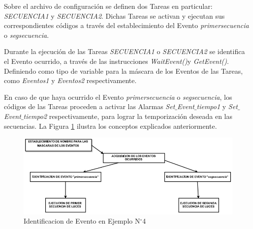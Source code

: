 \documentclass[12pt,letterpaper]{article}
\begin{document}
Sobre el archivo de configuración se definen dos Tareas en particular: \textit{SECUENCIA1} y \textit{SECUENCIA2}. Dichas Tareas se activan y ejecutan sus correspondientes códigos a través del establecimiento del Evento \textit{primersecuencia} o \textit{segsecuencia}.

Durante la ejecución de las Tareas \textit{SECUENCIA1} o \textit{SECUENCIA2} se identifica el Evento ocurrido, a través de las instrucciones \textit{WaitEvent()}y \textit{GetEvent()}. Definiendo como tipo de variable para la máscara de los Eventos de las Tareas, como \textit{Eventos1} y \textit{Eventos2} respectivamente.

En caso de que haya ocurrido el Evento \textit{primersecuencia} o \textit{segsecuencia}, los códigos de las Tareas proceden a activar las Alarmas \textit{Set$\_$Event$\_$tiempo1} y \textit{Set$\_$Event$\_$tiempo2} respectivamente, para lograr la temporización deseada en las secuencias. La Figura \ref{Fig42} ilustra los conceptos explicados anteriormente.

\begin{center}
\begin{figure}[!h]
\centering
\includegraphics[width=10 cm]{figuras/f33.png}
\caption{Identificacion de Evento en Ejemplo N$^{\circ}$4}
\label{Fig42}
\end{figure}
\end{center}
\end{document}
